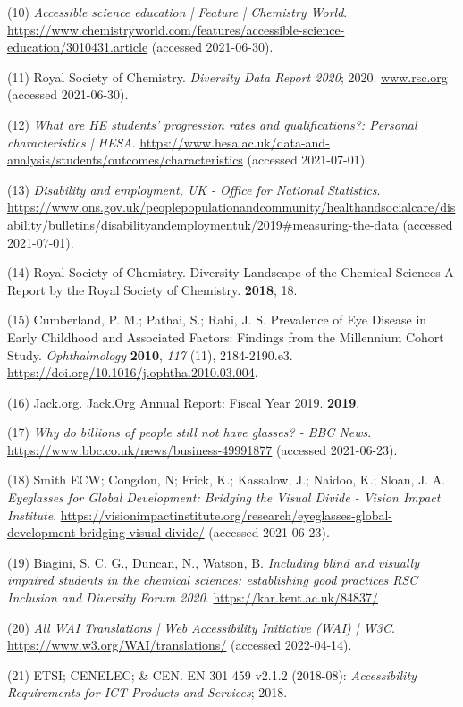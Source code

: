 \documentclass[11.5pt]{sig-alternate} %
\begin{document}
(10)	\textit{Accessible science education | Feature | Chemistry World}. \url{https://www.chemistryworld.com/features/accessible-science-education/3010431.article} (accessed 2021-06-30).

(11)	Royal Society of Chemistry. \textit{Diversity Data Report 2020}; 2020. \url{www.rsc.org} (accessed 2021-06-30).

(12)	\textit{What are HE students’ progression rates and qualifications?: Personal characteristics | HESA}. \url{https://www.hesa.ac.uk/data-and-analysis/students/outcomes/characteristics} (accessed 2021-07-01).

(13)	\textit{Disability and employment, UK - Office for National Statistics}. 
\url{https://www.ons.gov.uk/peoplepopulationandcommunity/healthandsocialcare/disability/bulletins/disabilityandemploymentuk/2019#measuring-the-data} (accessed 2021-07-01).

(14)	Royal Society of Chemistry. Diversity Landscape of the Chemical Sciences A Report by the Royal Society of Chemistry. \textbf{2018}, 18.

(15)	Cumberland, P. M.; Pathai, S.; Rahi, J. S. Prevalence of Eye Disease in Early Childhood and Associated Factors: Findings from the Millennium Cohort Study. \textit{Ophthalmology} \textbf{2010}, \textit{117} (11), 2184-2190.e3. \url{https://doi.org/10.1016/j.ophtha.2010.03.004}.

(16)	Jack.org. Jack.Org Annual Report: Fiscal Year 2019. \textbf{2019}.

(17)	\textit{Why do billions of people still not have glasses? - BBC News}. \url{https://www.bbc.co.uk/news/business-49991877} (accessed 2021-06-23).

(18)	Smith ECW; Congdon, N; Frick, K.; Kassalow, J.; Naidoo, K.; Sloan, J. A. \textit{Eyeglasses for Global Development: Bridging the Visual Divide - Vision Impact Institute}. \url{https://visionimpactinstitute.org/research/eyeglasses-global-development-bridging-visual-divide/} (accessed 2021-06-23).

(19)	Biagini, S. C. G., Duncan, N., Watson, B. \textit{Including blind and visually impaired students in the chemical sciences: establishing good practices RSC Inclusion and Diversity Forum 2020}. \url{https://kar.kent.ac.uk/84837/}

(20)	\textit{All WAI Translations | Web Accessibility Initiative (WAI) | W3C}. \url{https://www.w3.org/WAI/translations/} (accessed 2022-04-14).

(21)	ETSI; CENELEC; \& CEN. EN 301 459 v2.1.2 (2018-08): \textit{Accessibility Requirements for ICT Products and Services}; 2018.
\end{document}
